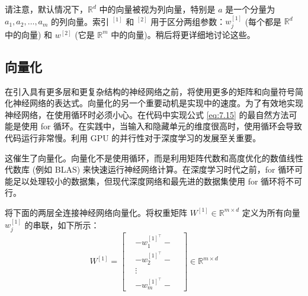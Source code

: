 请注意，默认情况下，$\mathbb{R}^d$ 中的向量被视为列向量，特别是 $a$ 是一个分量为 $a_1, a_2, \dots, a_m$ 的列向量。索引 $^{[1]}$ 和 $^{[2]}$ 用于区分两组参数：$w_j^{[1]}$ (每个都是 $\mathbb{R}^d$ 中的向量) 和 $w^{[2]}$ (它是 $\mathbb{R}^m$ 中的向量)。稍后将更详细地讨论这些。

\subsection*{向量化}

在引入具有更多层和更复杂结构的神经网络之前，将使用更多的矩阵和向量符号简化神经网络的表达式。向量化的另一个重要动机是实现中的速度。为了有效地实现神经网络，在使用循环时必须小心。在代码中实现公式 \eqref{eq:7.15} 的最自然方法可能是使用 for 循环。在实践中，当输入和隐藏单元的维度很高时，使用循环会导致代码运行非常慢。利用 GPU 的并行性对于深度学习的发展至关重要。

这催生了向量化。向量化不是使用循环，而是利用矩阵代数和高度优化的数值线性代数库 (例如 BLAS) 来快速运行神经网络计算。在深度学习时代之前，for 循环可能足以处理较小的数据集，但现代深度网络和最先进的数据集使用 for 循环将不可行。

将下面的两层全连接神经网络向量化。将权重矩阵 $W^{[1]} \in \mathbb{R}^{m \times d}$ 定义为所有向量 $w_j^{[1]}$ 的串联，如下所示：
\begin{equation}
    W^{[1]} = \begin{bmatrix}
    & - w_1^{[1]^\top} - & \\
    & - w_2^{[1]^\top} - & \\
    & \vdots & \\
    & - w_m^{[1]^\top} - &
    \end{bmatrix} \in \mathbb{R}^{m \times d}
    \label{eq:7.17}
\end{equation}

